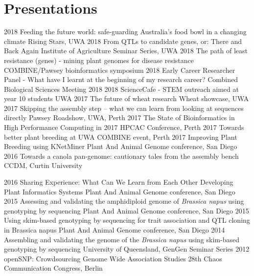 \documentclass[]{friggeri-cv} %
\begin{document}
\section{Presentations}
\begin{entrylist}

\entry
{2018}
{Feeding the future world: safe-guarding Australia’s food bowl in a changing climate}
{}
{Rising Stars, UWA}
\entry
{2018}
{From QTLs to candidate genes, or: There and Back Again}
{}
{Institute of Agriculture Seminar Series, UWA}
\entry
{2018}
{The path of least resistance (genes) - mining plant genomes for disease resistance}
{}
{COMBINE/Pawsey bioinformatics symposium}
\entry
{2018}
{Early Career Researcher Panel - What have I learnt at the beginning of my research career?}
{}
{Combined Biological Sciences Meeting 2018}
\entry
{2018}
{ScienceCafe - STEM outreach aimed at year 10 students}
{}
{UWA}
\entry
{2017}
{The future of wheat research}
{}
{Wheat showcase, UWA}
\entry
{2017}
{Skipping the assembly step – what we can learn from looking at sequences directly}
{}
{Pawsey Roadshow, UWA, Perth}
\entry
{2017}
{The State of Bioinformatics in High Performance Computing in 2017}
{}
{HPCAC Conference, Perth}
\entry
{2017}
{Towards better plant breeding at UWA}
{}
{COMBINE event, Perth}
\entry
{2017}
{Improving Plant Breeding using KNetMiner}
{}
{Plant And Animal Genome conference, San Diego}
\entry
{2016}
{Towards a canola pan-genome: cautionary tales from the assembly bench}
{}
{CCDM, Curtin University}
\end{entrylist}
\begin{entrylist}
\entry
{2016}
{Sharing Experience: What Can We Learn from Each Other Developing Plant Informatics Systems}
{}
{Plant And Animal Genome conference, San Diego}
\entry
{2015}
{Assessing and validating the amphidiploid genome of \textit{Brassica napus} using genotyping by sequencing}
{}
{Plant And Animal Genome conference, San Diego}
\entry
{2015}
{Using skim-based genotyping by sequencing for trait association and QTL cloning in Brassica napus}
{}
{Plant And Animal Genome conference, San Diego}
\entry
{2014}
{Assembling and validating the genome of the \textit{Brassica napus} using skim-based genotyping by sequencing}
{}
{University of Queensland, GenGen Seminar Series}
\entry
{2012}
{openSNP: Crowdsourcing Genome Wide Association Studies}
{}
{28th Chaos Communication Congress, Berlin}
\end{entrylist}
\end{document}
